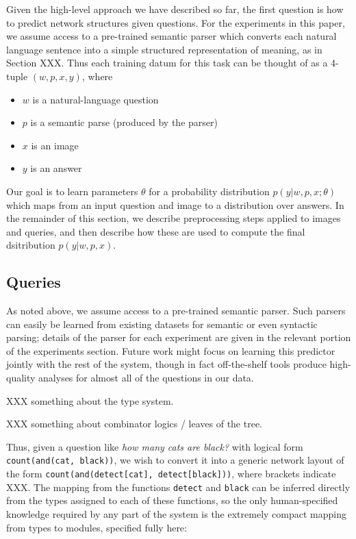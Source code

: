 \documentclass[10pt,twocolumn,letterpaper]{article}
\begin{document}
Given the high-level approach we have described so far, the first question is how to
predict network structures given questions.
For the experiments in this paper, we assume access to a pre-trained semantic parser
which converts each natural language sentence into a simple structured
representation of meaning, as in Section XXX. Thus each training datum for this
task can be thought of as a 4-tuple $(w, p, x, y)$, where
\begin{itemize}
  \item $w$ is a natural-language question
  \item $p$ is a semantic parse (produced by the parser)
  \item $x$ is an image
  \item $y$ is an answer
\end{itemize}
Our goal is to learn parameters $\theta$ for a probability distribution $p(y |
w, p, x; \theta)$
which maps from an input question and image to a distribution over answers. In
the remainder of this section, we describe preprocessing steps applied to images
and queries, and then describe how these are used to compute the final
dsitribution $p(y | w, p, x)$.

\subsection{Queries}

As noted above, we assume access to a pre-trained semantic parser. Such parsers
can easily be learned from existing datasets for semantic or even syntactic
parsing; details of the parser for each experiment are given in the relevant
portion of the experiments section. Future work might focus on learning this
predictor jointly with the rest of the system, though in fact off-the-shelf
tools produce high-quality analyses for almost all of the questions in our
data.

XXX something about the type system.

XXX something about combinator logics / leaves of the tree.

Thus, given a question like \emph{how many cats are black?} with logical form
{\small\tt count(and(cat, black))}, we wish to convert it into a generic network
layout of the form {\small\tt count(and(detect[cat], detect[black]))}, where
brackets indicate XXX. The mapping from the functions {\small\tt detect} and
{\small\tt black} can be inferred directly from the types assigned to each of
these functions, so the only human-specified knowledge required by any part of
the system is the extremely compact mapping from types to modules, specified
fully here:
\end{document}
